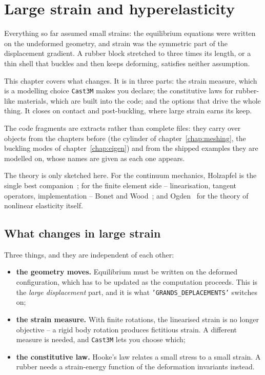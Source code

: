 \chapter{Large strain and hyperelasticity}
\label{chap:largestrain}


Everything so far assumed small strains: the equilibrium equations were
written on the undeformed geometry, and strain was the symmetric part of the
displacement gradient. A rubber block stretched to three times its length,
or a thin shell that buckles and then keeps deforming, satisfies neither
assumption.

This chapter covers what changes. It is in three parts: the strain measure,
which is a modelling choice \texttt{Cast3M} makes you declare; the
constitutive laws for rubber-like materials, which are built into the code;
and the  options that drive the whole thing. It closes on contact
and post-buckling, where large strain earns its keep.

The code fragments are extracts rather than complete files: they carry over
objects from the chapters before (the cylinder of chapter~\ref{chap:meshing},
the buckling modes of chapter~\ref{chap:eigen}) and from the shipped examples
they are modelled on, whose names are given as each one appears.

The theory is only sketched here. For the continuum mechanics, Holzapfel is
the single best companion~\cite{Holzapfel:2000}; for the finite element side
-- linearisation, tangent operators, implementation -- Bonet and
Wood~\cite{BonetWood:2008}; and Ogden~\cite{Ogden:1984} for the theory of
nonlinear elasticity itself.

\section{What changes in large strain}
\label{sec:ls:changes}

Three things, and they are independent of each other:

\begin{itemize}
%
%
\item \textbf{the geometry moves.} Equilibrium must be written on the
  deformed configuration, which has to be updated as the computation
  proceeds. This is the \emph{large displacement} part, and it is what
  \texttt{'GRANDS\_DEPLACEMENTS'} switches on;
\item \textbf{the strain measure.} With finite rotations, the linearised
  strain is no longer objective -- a rigid body rotation produces fictitious
  strain. A different measure is needed, and \texttt{Cast3M} lets you choose
  which;
\item \textbf{the constitutive law.} Hooke's law relates a small stress to a
  small strain. A rubber needs a strain-energy function of the deformation
  invariants instead.
\end{itemize}

